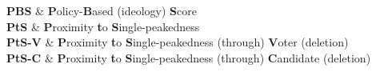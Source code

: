 \documentclass[11pt, oneside, dvipsnames]{Thesis} %
\begin{document}

\pagestyle{fancy} %

\tableofcontents %


\listoffigures %

\listoftables %



\clearpage %


{
	\textbf{PBS} & \textbf{P}olicy-\textbf{B}ased (ideology) \textbf{S}core\\
	\textbf{PtS} & \textbf{P}roximity \textbf{t}o \textbf{S}ingle-peakedness\\
	\textbf{PtS-V} & \textbf{P}roximity \textbf{t}o \textbf{S}ingle-peakedness (through) \textbf{V}oter (deletion)\\
	\textbf{PtS-C} & \textbf{P}roximity \textbf{t}o \textbf{S}ingle-peakedness (through) \textbf{C}andidate (deletion)\\
}

\end{document}
